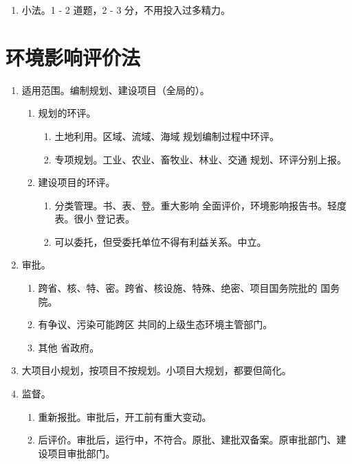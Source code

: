 \begin{enumerate}
  \item 小法。1 - 2 道题，2 - 3 分，不用投入过多精力。
\end{enumerate}

\section{环境影响评价法}
\begin{enumerate}
  \item 适用范围。编制规划、建设项目（全局的）。
        \begin{enumerate}
          \item 规划的环评。
                \begin{enumerate}
                  \item 土地利用。区域、流域、海域 \yjt 规划编制过程中环评。
                  \item 专项规划。工业、农业、畜牧业、林业、交通 \yjt 规划、环评分别上报。
                \end{enumerate}
          \item 建设项目的环评。
                \begin{enumerate}
                  \item 分类管理。书、表、登。重大影响 \yjt 全面评价，环境影响报告书。轻度 \yjt 表。很小 \yjt 登记表。
                  \item 可以委托，但受委托单位不得有利益关系。中立。
                \end{enumerate}
        \end{enumerate}
  \item 审批。
        \begin{enumerate}
          \item 跨省、核、特、密。跨省、核设施、特殊、绝密、项目国务院批的 \yjt 国务院。
          \item 有争议、污染可能跨区 \yjt 共同的上级生态环境主管部门。
          \item 其他 \yjt 省政府。
        \end{enumerate}
  \item 大项目小规划，按项目不按规划。小项目大规划，都要但简化。
  \item 监督。
        \begin{enumerate}
          \item 重新报批。审批后，开工前有重大变动。
          \item 后评价。审批后，运行中，不符合。原批、建批双备案。原审批部门、建设项目审批部门。

\end{enumerate}
\end{enumerate}
